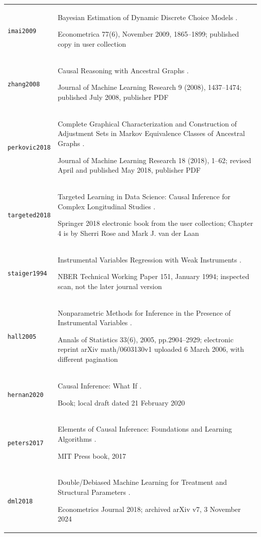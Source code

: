 \begin{longtable}{P{32mm}P{112mm}}
{\scriptsize\texttt{imai2009}} & Bayesian Estimation of Dynamic Discrete Choice Models \citep{imai2009}.\par Econometrica 77(6), November 2009, 1865--1899; published copy in user collection\\
{\scriptsize\texttt{zhang2008}} & Causal Reasoning with Ancestral Graphs \citep{zhang2008}.\par Journal of Machine Learning Research 9 (2008), 1437--1474; published July 2008, publisher PDF\\
{\scriptsize\texttt{perkovic2018}} & Complete Graphical Characterization and Construction of Adjustment Sets in Markov Equivalence Classes of Ancestral Graphs \citep{perkovic2018}.\par Journal of Machine Learning Research 18 (2018), 1--62; revised April and published May 2018, publisher PDF\\
{\scriptsize\texttt{targeted2018}} & Targeted Learning in Data Science: Causal Inference for Complex Longitudinal Studies \citep{targeted2018}.\par Springer 2018 electronic book from the user collection; Chapter 4 is by Sherri Rose and Mark J. van der Laan\\
{\scriptsize\texttt{staiger1994}} & Instrumental Variables Regression with Weak Instruments \citep{staiger1994}.\par NBER Technical Working Paper 151, January 1994; inspected scan, not the later journal version\\
{\scriptsize\texttt{hall2005}} & Nonparametric Methods for Inference in the Presence of Instrumental Variables \citep{hall2005}.\par Annals of Statistics 33(6), 2005, pp.2904--2929; electronic reprint arXiv math/0603130v1 uploaded 6 March 2006, with different pagination\\
{\scriptsize\texttt{hernan2020}} & Causal Inference: What If \citep{hernan2020}.\par Book; local draft dated 21 February 2020\\
{\scriptsize\texttt{peters2017}} & Elements of Causal Inference: Foundations and Learning Algorithms \citep{peters2017}.\par MIT Press book, 2017\\
{\scriptsize\texttt{dml2018}} & Double/Debiased Machine Learning for Treatment and Structural Parameters \citep{dml2018}.\par Econometrics Journal 2018; archived arXiv v7, 3 November 2024\\

\end{longtable}
